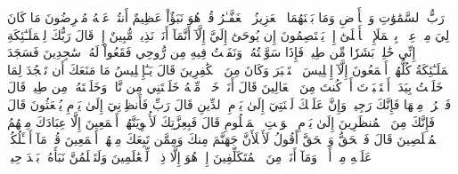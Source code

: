 رَبُّ ٱلسَّمَٰوَٰتِ وَٱلۡأَرۡضِ وَمَا بَيۡنَهُمَا ٱلۡعَزِيزُ ٱلۡغَفَّـٰرُ
قُلۡ هُوَ نَبَؤٌاْ عَظِيمٌ
أَنتُمۡ عَنۡهُ مُعۡرِضُونَ
مَا كَانَ لِيَ مِنۡ عِلۡمِۭ بِٱلۡمَلَإِ ٱلۡأَعۡلَىٰٓ إِذۡ يَخۡتَصِمُونَ
إِن يُوحَىٰٓ إِلَيَّ إِلَّآ أَنَّمَآ أَنَا۠ نَذِيرٞ مُّبِينٌ
إِذۡ قَالَ رَبُّكَ لِلۡمَلَـٰٓئِكَةِ إِنِّي خَٰلِقُۢ بَشَرٗا مِّن طِينٖ
فَإِذَا سَوَّيۡتُهُۥ وَنَفَخۡتُ فِيهِ مِن رُّوحِي فَقَعُواْ لَهُۥ سَٰجِدِينَ
فَسَجَدَ ٱلۡمَلَـٰٓئِكَةُ كُلُّهُمۡ أَجۡمَعُونَ
إِلَّآ إِبۡلِيسَ ٱسۡتَكۡبَرَ وَكَانَ مِنَ ٱلۡكَٰفِرِينَ
قَالَ يَـٰٓإِبۡلِيسُ مَا مَنَعَكَ أَن تَسۡجُدَ لِمَا خَلَقۡتُ بِيَدَيَّۖ أَسۡتَكۡبَرۡتَ أَمۡ كُنتَ مِنَ ٱلۡعَالِينَ
قَالَ أَنَا۠ خَيۡرٞ مِّنۡهُ خَلَقۡتَنِي مِن نَّارٖ وَخَلَقۡتَهُۥ مِن طِينٖ
قَالَ فَٱخۡرُجۡ مِنۡهَا فَإِنَّكَ رَجِيمٞ
وَإِنَّ عَلَيۡكَ لَعۡنَتِيٓ إِلَىٰ يَوۡمِ ٱلدِّينِ
قَالَ رَبِّ فَأَنظِرۡنِيٓ إِلَىٰ يَوۡمِ يُبۡعَثُونَ
قَالَ فَإِنَّكَ مِنَ ٱلۡمُنظَرِينَ
إِلَىٰ يَوۡمِ ٱلۡوَقۡتِ ٱلۡمَعۡلُومِ
قَالَ فَبِعِزَّتِكَ لَأُغۡوِيَنَّهُمۡ أَجۡمَعِينَ
إِلَّا عِبَادَكَ مِنۡهُمُ ٱلۡمُخۡلَصِينَ
قَالَ فَٱلۡحَقُّ وَٱلۡحَقَّ أَقُولُ
لَأَمۡلَأَنَّ جَهَنَّمَ مِنكَ وَمِمَّن تَبِعَكَ مِنۡهُمۡ أَجۡمَعِينَ
قُلۡ مَآ أَسۡـَٔلُكُمۡ عَلَيۡهِ مِنۡ أَجۡرٖ وَمَآ أَنَا۠ مِنَ ٱلۡمُتَكَلِّفِينَ
إِنۡ هُوَ إِلَّا ذِكۡرٞ لِّلۡعَٰلَمِينَ
وَلَتَعۡلَمُنَّ نَبَأَهُۥ بَعۡدَ حِينِۭ